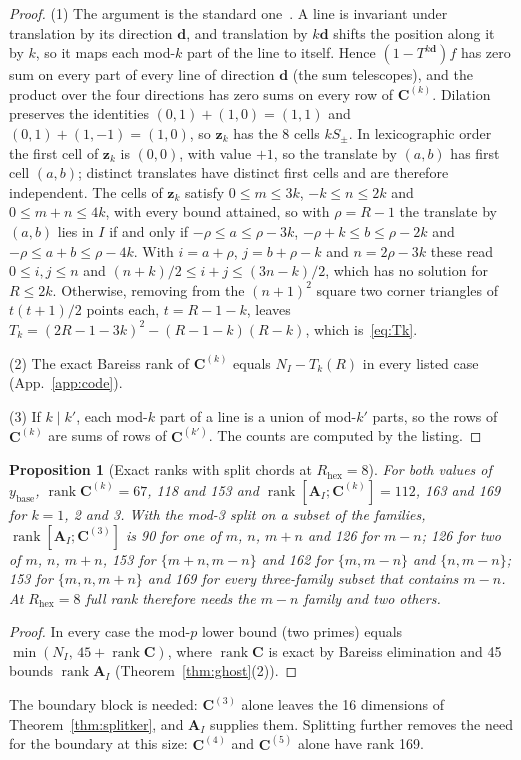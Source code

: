 \documentclass[11pt,a4paper]{article}
\newtheorem{proposition}[theorem]{Proposition}
\theoremstyle{definition}
\theoremstyle{remark}
\begin{document}
\begin{proof}
(1) The argument is the standard one~\cite{hajdu2001}. A line is invariant under translation by its direction $\mathbf{d}$, and translation by $k\mathbf{d}$ shifts the position along it by $k$, so it maps each mod-$k$ part of the line to itself. Hence $(1-T^{k\mathbf{d}})f$ has zero sum on every part of every line of direction $\mathbf{d}$ (the sum telescopes), and the product over the four directions has zero sums on every row of $\mathbf{C}^{(k)}$. Dilation preserves the identities $(0,1)+(1,0) = (1,1)$ and $(0,1)+(1,-1) = (1,0)$, so $\mathbf{z}_k$ has the 8 cells $kS_\pm$. In lexicographic order the first cell of $\mathbf{z}_k$ is $(0,0)$, with value $+1$, so the translate by $(a,b)$ has first cell $(a,b)$; distinct translates have distinct first cells and are therefore independent. The cells of $\mathbf{z}_k$ satisfy $0\le m\le 3k$, $-k\le n\le 2k$ and $0\le m+n\le 4k$, with every bound attained, so with $\rho = R-1$ the translate by $(a,b)$ lies in $I$ if and only if $-\rho\le a\le\rho-3k$, $-\rho+k\le b\le\rho-2k$ and $-\rho\le a+b\le\rho-4k$. With $i = a+\rho$, $j = b+\rho-k$ and $n = 2\rho-3k$ these read $0\le i,j\le n$ and $(n+k)/2\le i+j\le(3n-k)/2$, which has no solution for $R\le 2k$. Otherwise, removing from the $(n+1)^2$ square two corner triangles of $t(t+1)/2$ points each, $t = R-1-k$, leaves $T_k = (2R-1-3k)^2-(R-1-k)(R-k)$, which is~\eqref{eq:Tk}.

(2) The exact Bareiss rank of $\mathbf{C}^{(k)}$ equals $N_I-T_k(R)$ in every listed case (App.~\ref{app:code}).

(3) If $k\mid k'$, each mod-$k$ part of a line is a union of mod-$k'$ parts, so the rows of $\mathbf{C}^{(k)}$ are sums of rows of $\mathbf{C}^{(k')}$. The counts are computed by the listing.
\end{proof}

\begin{proposition}[Exact ranks with split chords at $R_{\text{hex}} = 8$]\label{prop:split}
For both values of $y_{\text{base}}$, $\operatorname{rank}\mathbf{C}^{(k)} = 67$, 118 and 153 and $\operatorname{rank}[\mathbf{A}_I;\mathbf{C}^{(k)}] = 112$, 163 and 169 for $k = 1$, 2 and 3. With the mod-3 split on a subset of the families, $\operatorname{rank}[\mathbf{A}_I;\mathbf{C}^{(3)}]$ is 90 for one of $m$, $n$, $m+n$ and 126 for $m-n$; 126 for two of $m$, $n$, $m+n$, 153 for $\{m+n,m-n\}$ and 162 for $\{m,m-n\}$ and $\{n,m-n\}$; 153 for $\{m,n,m+n\}$ and 169 for every three-family subset that contains $m-n$. At $R_{\text{hex}} = 8$ full rank therefore needs the $m-n$ family and two others.
\end{proposition}
\begin{proof}
In every case the mod-$p$ lower bound (two primes) equals $\min(N_I,\,45+\operatorname{rank}\mathbf{C})$, where $\operatorname{rank}\mathbf{C}$ is exact by Bareiss elimination and 45 bounds $\operatorname{rank}\mathbf{A}_I$ (Theorem~\ref{thm:ghost}(2)).
\end{proof}
The boundary block is needed: $\mathbf{C}^{(3)}$ alone leaves the 16 dimensions of Theorem~\ref{thm:splitker}, and $\mathbf{A}_I$ supplies them. Splitting further removes the need for the boundary at this size: $\mathbf{C}^{(4)}$ and $\mathbf{C}^{(5)}$ alone have rank 169.
\end{document}
